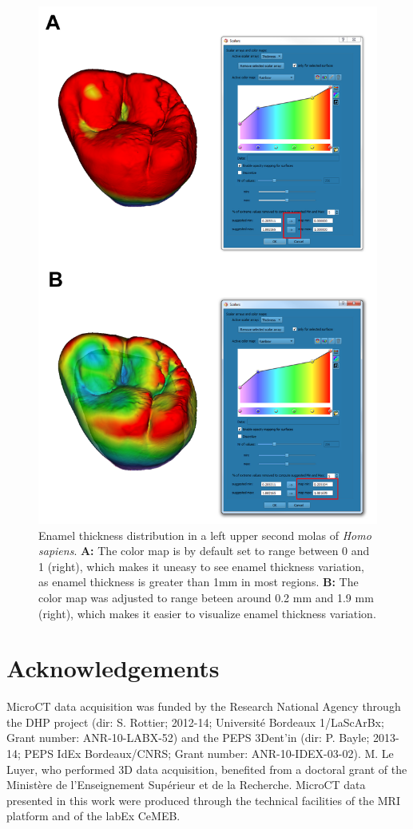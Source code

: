 \documentclass[12pt, a4paper]{book}
\begin{document}
\begin{figure}
  \centering
  \includegraphics[scale=0.33]{thickness_colormap.png}
\caption{Enamel thickness distribution in a left upper second molas of \textit{Homo sapiens}. \textbf{A:} The color map is by default set to range between 0 and 1 (right), which makes it uneasy to see enamel thickness variation, as enamel thickness is greater than 1mm in most regions. \textbf{B:} The color map was adjusted to range beteen around 0.2 mm and 1.9 mm (right), which makes it easier to visualize enamel thickness variation.}	
\label{thickness_colormap}
 \end{figure}

\section{Acknowledgements}
MicroCT data acquisition was funded by the Research National Agency through the DHP project (dir: S. Rottier; 2012-14; Université Bordeaux 1/LaScArBx; Grant number: ANR-10-LABX-52) and the PEPS 3Dent’in (dir: P. Bayle; 2013-14; PEPS IdEx Bordeaux/CNRS; Grant number: ANR-10-IDEX-03-02). M. Le Luyer, who performed 3D data acquisition, benefited from a doctoral grant of the Ministère de l’Enseignement Supérieur et de la Recherche. MicroCT data presented in this work were produced through the technical facilities of the MRI platform and of the labEx CeMEB.




	
\end{document}
